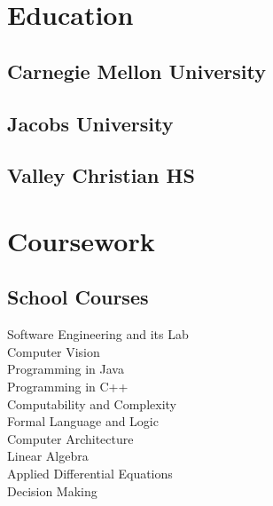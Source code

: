 \documentclass[]{deedy-resume-openfont}
\begin{document}
%
%

%
%



%
%

\begin{minipage}[t]{0.33\textwidth} 


\section{Education} 
\subsection{\normalsize{Carnegie Mellon University}}
\sectionsep

\subsection{Jacobs University}
\sectionsep

\subsection{Valley Christian HS}
\sectionsep


\section{Coursework}

\subsection{School Courses}
Software Engineering and its Lab \\
Computer Vision \\
Programming in Java \\
Programming in C++ \\
Computability and Complexity \\
Formal Language and Logic \\
Computer Architecture \\ 
Linear Algebra \\
Applied Differential Equations \\ 
Decision Making
 

\end{minipage}
\end{document}
